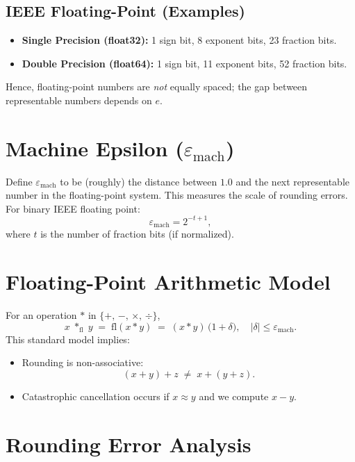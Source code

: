 \documentclass[12pt]{article}
\begin{document}
\subsection*{IEEE Floating-Point (Examples)}

\begin{itemize}
    \item \textbf{Single Precision (float32):} 1 sign bit, 8 exponent bits, 23 fraction bits.
    \item \textbf{Double Precision (float64):} 1 sign bit, 11 exponent bits, 52 fraction bits.
\end{itemize}

\noindent
Hence, floating-point numbers are \emph{not} equally spaced; the gap between representable numbers depends on $e$.

\section*{Machine Epsilon \texorpdfstring{($\varepsilon_{\mathrm{mach}}$)}{}}

Define $\varepsilon_{\mathrm{mach}}$ to be (roughly) the distance between $1.0$ and the next representable number in the floating-point system. This measures the scale of rounding errors. For binary IEEE floating point:
\[
\varepsilon_{\mathrm{mach}} = 2^{-t+1},
\]
where $t$ is the number of fraction bits (if normalized).

\section*{Floating-Point Arithmetic Model}

For an operation $*$ in $\{+,\,-,\,\times,\,\div\}$,
\[
x \;*_{\mathrm{fl}}\; y \;=\; \mathrm{fl}(x * y) \;=\; (x * y)\,\bigl(1 + \delta\bigr),
\quad
|\delta| \le \varepsilon_{\mathrm{mach}}.
\]
This standard model implies:

\begin{itemize}
    \item Rounding is non-associative:
    \[
      (x + y) + z \;\neq\; x + (y + z).
    \]
    \item Catastrophic cancellation occurs if $x \approx y$ and we compute $x - y$.
\end{itemize}

\section*{Rounding Error Analysis}
\end{document}
